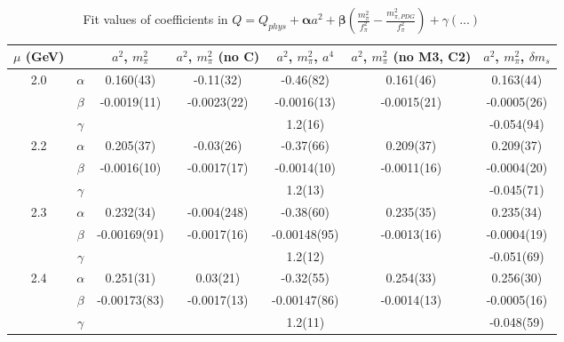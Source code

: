 \documentclass[12pt]{extarticle}
\begin{document}
\begin{table}[h!]
\begin{center}
\begin{tabular}{|c c|c|c|c|c|c|}
\hline
$\mu$ (GeV) &  & $a^2$, $m_\pi^2$& $a^2$, $m_\pi^2$ (no C)& $a^2$, $m_\pi^2$, $a^4$& $a^2$, $m_\pi^2$ (no M3, C2)& $a^2$, $m_\pi^2$, $\delta m_s$\\
\hline
\multirow{3}{0.5in}{2.0} & $\alpha$ & 0.160(43)& -0.11(32)& -0.46(82)& 0.161(46)& 0.163(44)\\
 & $\beta$ & -0.0019(11)& -0.0023(22)& -0.0016(13)& -0.0015(21)& -0.0005(26)\\
 & $\gamma$ &  &  & 1.2(16)&  & -0.054(94)\\
\hline
\multirow{3}{0.5in}{2.2} & $\alpha$ & 0.205(37)& -0.03(26)& -0.37(66)& 0.209(37)& 0.209(37)\\
 & $\beta$ & -0.0016(10)& -0.0017(17)& -0.0014(10)& -0.0011(16)& -0.0004(20)\\
 & $\gamma$ &  &  & 1.2(13)&  & -0.045(71)\\
\hline
\multirow{3}{0.5in}{2.3} & $\alpha$ & 0.232(34)& -0.004(248)& -0.38(60)& 0.235(35)& 0.235(34)\\
 & $\beta$ & -0.00169(91)& -0.0017(16)& -0.00148(95)& -0.0013(16)& -0.0004(19)\\
 & $\gamma$ &  &  & 1.2(12)&  & -0.051(69)\\
\hline
\multirow{3}{0.5in}{2.4} & $\alpha$ & 0.251(31)& 0.03(21)& -0.32(55)& 0.254(33)& 0.256(30)\\
 & $\beta$ & -0.00173(83)& -0.0017(13)& -0.00147(86)& -0.0014(13)& -0.0005(16)\\
 & $\gamma$ &  &  & 1.2(11)&  & -0.048(59)\\
\hline
\end{tabular}
\caption{Fit values of coefficients in $Q = Q_{phys} + \mathbf{\alpha} a^2 + \mathbf{\beta}\left(\frac{m_\pi^2}{f_\pi^2}-\frac{m_{\pi,PDG}^2}{f_\pi^2}\right) + \gamma(\ldots)$}
\end{center}
\end{table}




















\clearpage
\end{document}
